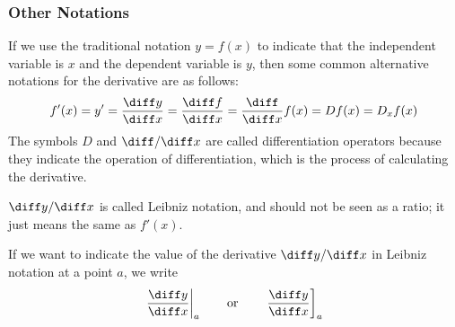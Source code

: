\begin{frame}
\frametitle{Other Notations}
If we use the traditional notation $y = f(x)$ to indicate that the independent variable is $x$ and the dependent variable is $y$, then some common alternative notations for the derivative are as follows:
\[
f'(x) = y' = \frac{\diff y}{\diff x} = \frac{\diff f}{\diff x} = \frac{\diff}{\diff x} f(x) = Df(x) = D_x f(x)
\]
The symbols $D$ and $\diff/\diff x$ are called differentiation operators because they indicate the operation of differentiation, which is the process of calculating the derivative.

$\diff y/\diff x$ is called Leibniz notation, and should not be seen as a ratio; it just means the same as $f'(x)$.  

If we want to indicate the value of the derivative $\diff y/\diff x$ in Leibniz notation at a point $a$, we write
\[
\left. \frac{\diff y}{\diff x}\right|_a \qquad \textrm{or}\qquad \left. \frac{\diff y}{\diff x}\right]_a
\]
\end{frame}

